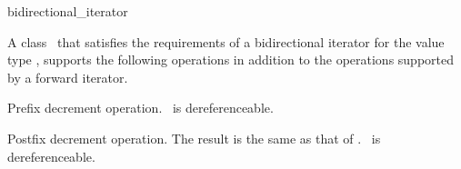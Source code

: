 \begin{ccClass}{bidirectional_iterator}


\ccDefinition

A class \ccClassName\ that satisfies the requirements of a bidirectional
iterator for the value type , supports the following operations
in addition to the operations supported by a forward iterator.

\ccOperations

{Prefix decrement operation.
 \ccPrecond \ccVar\ is dereferenceable.}

{Postfix decrement operation. The result is the same as that of 
 .
 \ccPrecond \ccVar\ is dereferenceable.}

\end{ccClass} 

\newpage


